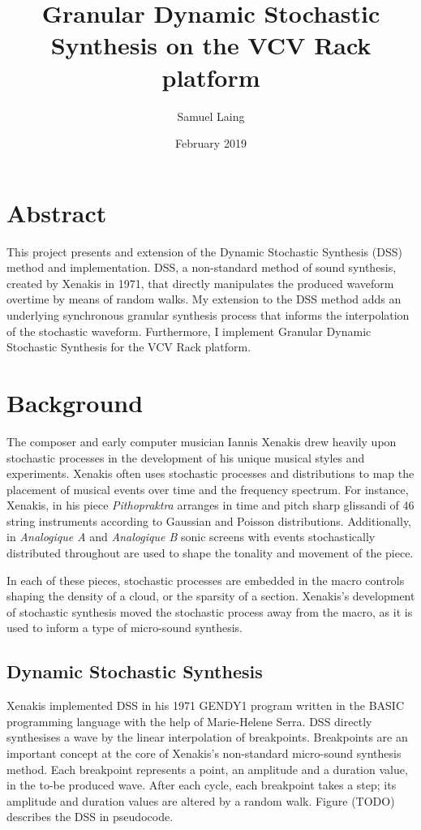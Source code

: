 \documentclass[10pt]{article}
\title{Granular Dynamic Stochastic Synthesis on the VCV Rack platform}
\author{Samuel Laing}
\date{February 2019}
\begin{document}
\maketitle

\pagebreak
\section{Abstract}
This project presents and extension of the Dynamic Stochastic Synthesis (DSS) method and implementation. DSS, a non-standard method of sound synthesis, created by Xenakis in 1971, that directly manipulates the produced waveform overtime by means of random walks. My extension to the DSS method adds an underlying synchronous granular synthesis process that informs the interpolation of the stochastic waveform. Furthermore, I implement Granular Dynamic Stochastic Synthesis for the VCV Rack platform. 

\section{Background}
The composer and early computer musician Iannis Xenakis drew heavily upon stochastic processes in the development of his unique musical styles and experiments. Xenakis often uses stochastic processes and distributions to map the placement of musical events over time and the frequency spectrum. For instance, Xenakis, in his piece \textit{Pithopraktra} arranges in time and pitch sharp glissandi of 46 string instruments according to Gaussian and Poisson distributions.\citep{xenakis1992} Additionally, in \textit{Analogique A} and \textit{Analogique B} sonic screens with events stochastically distributed throughout are used to shape the tonality and movement of the piece. 

In each of these pieces, stochastic processes are embedded in the macro controls shaping the density of a cloud, or the sparsity of a section. Xenakis's development of stochastic synthesis moved the stochastic process away from the macro, as it is used to inform a type of micro-sound synthesis.

\subsection{Dynamic Stochastic Synthesis}
Xenakis implemented DSS in his 1971 GENDY1 program written in the BASIC programming language with the help of Marie-Helene Serra.\citep{xenakis1992} DSS directly synthesises a wave by the linear interpolation of breakpoints. Breakpoints are an important concept at the core of Xenakis's non-standard micro-sound synthesis method. Each breakpoint represents a point, an amplitude and a duration value, in the to-be produced wave. After each cycle, each breakpoint takes a step; its amplitude and duration values are altered by a random walk.  Figure (TODO) describes the DSS in pseudocode.
\end{document}
